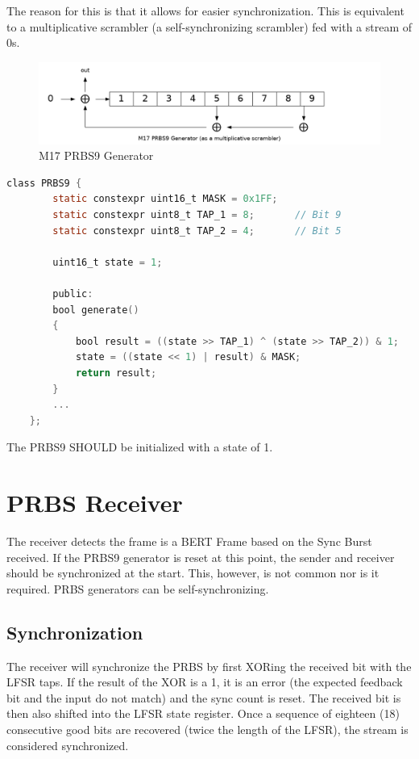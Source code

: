 \documentclass[a4paper,11pt]{book}
\begin{document}
The reason for this is that it allows for easier synchronization. This is equivalent to a multiplicative scrambler (a self-synchronizing scrambler) fed with a stream of 0s.

\begin{figure}[H]
	\centering
	\includegraphics[width=0.7\linewidth]{img/m17-equivalent-scrambler}
	\caption{M17 PRBS9 Generator}
	\label{fig:m17-equivalent-scrambler}
\end{figure}

\begin{lstlisting}[language=C]
	class PRBS9 {
		static constexpr uint16_t MASK = 0x1FF;
		static constexpr uint8_t TAP_1 = 8;       // Bit 9
		static constexpr uint8_t TAP_2 = 4;       // Bit 5
		
		uint16_t state = 1;
		
		public:
		bool generate()
		{
			bool result = ((state >> TAP_1) ^ (state >> TAP_2)) & 1;
			state = ((state << 1) | result) & MASK;
			return result;
		}
		...
	};
\end{lstlisting}

The PRBS9 SHOULD be initialized with a state of 1.

\section{PRBS Receiver}

The receiver detects the frame is a BERT Frame based on the Sync Burst received. If the PRBS9 generator is reset at this point, the sender and receiver should be synchronized at the start. This, however, is not common nor is it required. PRBS generators can be self-synchronizing.

\subsection{Synchronization}

The receiver will synchronize the PRBS by first XORing the received bit with the LFSR taps. If the result of the XOR is a 1, it is an error (the expected feedback bit and the input do not match) and the sync count is reset. The received bit is then also shifted into the LFSR state register. Once a sequence of eighteen (18) consecutive good bits are recovered (twice the length of the LFSR), the stream is considered synchronized.
\end{document}
